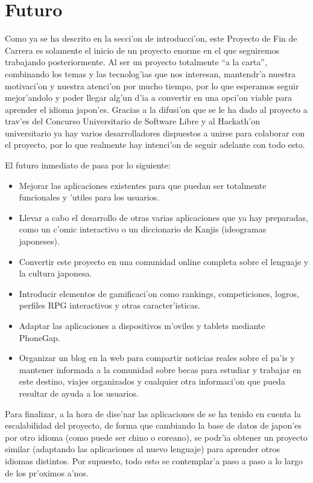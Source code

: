 \section{Futuro}
\label{sec:futuro}
Como ya se ha descrito en la secci'on de introducci'on, este Proyecto de Fin de Carrera es solamente el inicio
de un proyecto enorme en el que seguiremos trabajando posteriormente. Al ser un proyecto totalmente ``a la carta'',
combinando los temas y las tecnolog'ias que nos interesan, mantendr'a nuestra motivaci'on y nuestra atenci'on
por mucho tiempo, por lo que esperamos seguir mejor'andolo y poder llegar alg'un d'ia a convertir \Nipponline{}
en una opci'on viable para aprender el idioma japon'es. Gracias a la difusi'on que se le ha dado al proyecto a
trav'es del Concurso Universitario de Software Libre y al Hackath'on universitario ya hay varios desarrolladores
dispuestos a unirse para colaborar con el proyecto, por lo que realmente hay intenci'on de seguir adelante con
todo esto.

El futuro inmediato de \Nipponline{} pasa por lo siguiente:

\begin{itemize}
 \item Mejorar las aplicaciones existentes para que puedan ser totalmente
funcionales y 'utiles para los usuarios.
 \item Llevar a cabo el desarrollo de otras varias aplicaciones que ya hay
preparadas, como un c'omic interactivo o un diccionario de Kanjis (ideogramas japoneses).
 \item Convertir este proyecto en una comunidad online completa sobre el lenguaje y la cultura japonesa.
 \item Introducir elementos de gamificaci'on como rankings, competiciones, logros, perfiles RPG interactivos y otras
caracter'isticas.
 \item Adaptar las aplicaciones a dispositivos m'oviles y tablets mediante PhoneGap.
 \item Organizar un blog en la web para compartir noticias reales sobre el pa'is y mantener informada a la comunidad
 sobre becas para estudiar y trabajar en este destino, viajes organizados y cualquier otra informaci'on que pueda
 resultar de ayuda a los usuarios.

\end{itemize}

Para finalizar, a la hora de dise'nar las aplicaciones de \Nipponline{} se ha tenido en cuenta la escalabilidad del proyecto,
de forma que cambiando la base de datos de japon'es por otro idioma (como puede ser chino o coreano), se podr'ia
obtener un proyecto similar (adaptando las aplicaciones al nuevo lenguaje) para aprender otros idiomas distintos. Por supuesto,
todo esto se contemplar'a paso a paso a lo largo de los pr'oximos a'nos.

